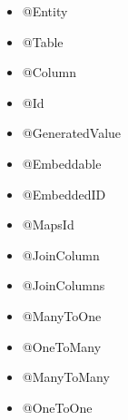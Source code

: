 \documentclass{beamer}
\begin{document}
\begin{frame}
\begin{itemize}
\item @Entity
\item @Table
\item @Column
\item @Id
\item @GeneratedValue
\item @Embeddable
\item @EmbeddedID
\item @MapsId
\item @JoinColumn
\item @JoinColumns
\item @ManyToOne
\item @OneToMany
\item @ManyToMany
\item @OneToOne
\end{itemize}
\end{frame}
\end{document}

